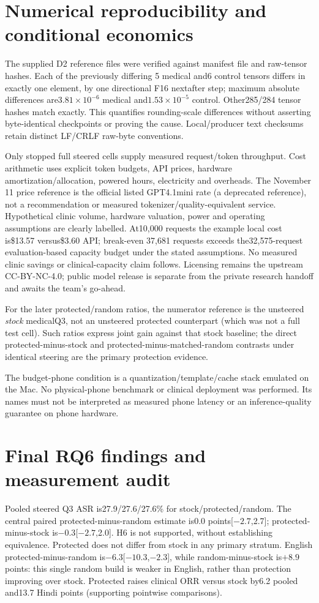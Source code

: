 \section{Numerical reproducibility and conditional economics}
The supplied D2 reference files were verified against manifest file and raw-tensor hashes. Each of the previously differing 5 medical and6 control tensors differs in exactly one element, by one directional F16 nextafter step; maximum absolute differences are$3.81\times10^{-6}$ medical and$1.53\times10^{-5}$ control. Other285/284 tensor hashes match exactly. This quantifies rounding-scale differences without asserting byte-identical checkpoints or proving the cause. Local/producer text checksums retain distinct LF/CRLF raw-byte conventions.

Only stopped full steered cells supply measured request/token throughput. Cost arithmetic uses explicit token budgets, API prices, hardware amortization/allocation, powered hours, electricity and overheads. The November 11 price reference is the official listed GPT4.1mini rate (a deprecated reference), not a recommendation or measured tokenizer/quality-equivalent service. Hypothetical clinic volume, hardware valuation, power and operating assumptions are clearly labelled. At10,000 requests the example local cost is\$13.57 versus\$3.60 API; break-even 37,681 requests exceeds the32,575-request evaluation-based capacity budget under the stated assumptions. No measured clinic savings or clinical-capacity claim follows. Licensing remains the upstream CC-BY-NC-4.0; public model release is separate from the private research handoff and awaits the team's go-ahead.

For the later protected/random ratios, the numerator reference is the unsteered \emph{stock} medicalQ3, not an unsteered protected counterpart (which was not a full test cell). Such ratios express joint gain against that stock baseline; the direct protected-minus-stock and protected-minus-matched-random contrasts under identical steering are the primary protection evidence.

The budget-phone condition is a quantization/template/cache stack emulated on the Mac. No physical-phone benchmark or clinical deployment was performed. Its names must not be interpreted as measured phone latency or an inference-quality guarantee on phone hardware.

\section{Final RQ6 findings and measurement audit}
Pooled steered Q3 ASR is27.9/27.6/27.6\% for stock/protected/random. The central paired protected-minus-random estimate is0.0 points[$-2.7$,2.7]; protected-minus-stock is$-0.3$[$-2.7$,2.0]. H6 is not supported, without establishing equivalence. Protected does not differ from stock in any primary stratum. English protected-minus-random is$-6.3$[$-10.3$,$-2.3$], while random-minus-stock is$+8.9$ points: this single random build is weaker in English, rather than protection improving over stock. Protected raises clinical ORR versus stock by6.2 pooled and13.7 Hindi points (supporting pointwise comparisons).


